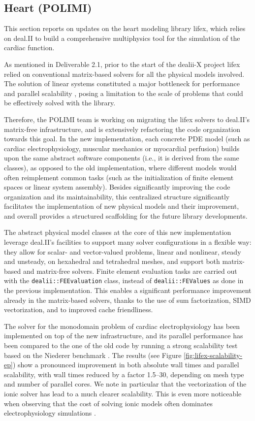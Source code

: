 \documentclass[a4paper,12pt]{article}
\begin{document}
\subsection{Heart (POLIMI)}

This section reports on updates on the heart modeling library lifex, which relies on deal.II to build a comprehensive multiphysics tool for the simulation of the cardiac function.

As mentioned in Deliverable 2.1, prior to the start of the dealii-X project lifex relied on conventional matrix-based solvers for all the physical models involved. The solution of linear systems constituted a major bottleneck for performance and parallel scalability \citep{africa2023lifexep,africa2024lifexcfd}, posing a limitation to the scale of problems that could be effectively solved with the library.

Therefore, the POLIMI team is working on migrating the lifex solvers to deal.II's matrix-free infrastructure, and is extensively refactoring the code organization towards this goal. In the new implementation, each concrete PDE model (such as cardiac electrophysiology, muscular mechanics or myocardial perfusion) builds upon the same abstract software components (i.e., it is derived from the same classes), as opposed to the old implementation, where different models would often reimplement common tasks (such as the initialization of finite element spaces or linear system assembly). Besides significantly improving the code organization and its maintainability, this centralized structure significantly facilitates the implementation of new physical models and their improvement, and overall provides a structured scaffolding for the future library developments.

The abstract physical model classes at the core of this new implementation leverage deal.II's facilities to support many solver configurations in a flexible way: they allow for scalar- and vector-valued problems, linear and nonlinear, steady and unsteady, on hexahedral and tetrahedral meshes, and support both matrix-based and matrix-free solvers. Finite element evaluation tasks are carried out with the \texttt{dealii::FEEvaluation} class, instead of \texttt{dealii::FEValues} as done in the previous implementation. This enables a significant performance improvement already in the matrix-based solvers, thanks to the use of sum factorization, SIMD vectorization, and to improved cache friendliness.

The solver for the monodomain problem of cardiac electrophysiology has been implemented on top of the new infrastructure, and its parallel performance has been compared to the one of the old code by running a strong scalability test based on the Niederer benchmark \citep{niederer2011verification}. The results (see Figure \ref{fig:lifex-scalability-ep}) show a pronounced improvement in both absolute wall times and parallel scalability, with wall times reduced by a factor 1.5--30, depending on mesh type and number of parallel cores. We note in particular that the vectorization of the ionic solver has lead to a much clearer scalability. This is even more noticeable when observing that the cost of solving ionic models often dominates electrophysiology simulations \citep{africa2023lifexep}.
\end{document}
